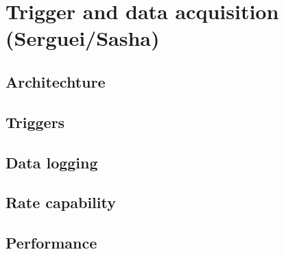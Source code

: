 
\section{Trigger and data acquisition (Serguei/Sasha) \label{sec:trigdaq}}
\subsection{Architechture \label{sec:trigdaqarchichecture}}
\subsection{Triggers \label{sec:trigdaqtriggers}}
\subsection{Data logging \label{sec:trigdaqdata}}
\subsection{Rate capability \label{sec:trigdaqrate}}
\subsection{Performance \label{sec:trigdaqperformance}}
